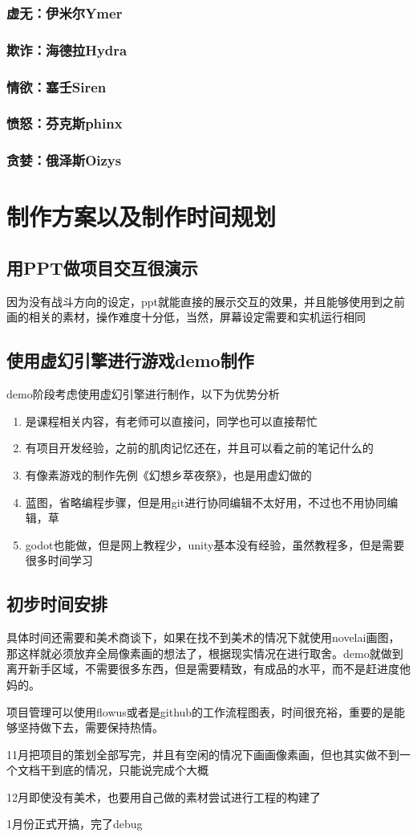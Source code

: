 \documentclass{ctexart}
\begin{document}
			\subsubsection{虚无：伊米尔Ymer}
			\subsubsection{欺诈：海德拉Hydra}
			\subsubsection{情欲：塞壬Siren}
			\subsubsection{愤怒：芬克斯phinx}
			\subsubsection{贪婪：俄泽斯Oizys}
		\section{制作方案以及制作时间规划}
			\subsection{用PPT做项目交互很演示}
			因为没有战斗方向的设定，ppt就能直接的展示交互的效果，并且能够使用到之前画的相关的素材，操作难度十分低，当然，屏幕设定需要和实机运行相同
			\subsection{使用虚幻引擎进行游戏demo制作}
			demo阶段考虑使用虚幻引擎进行制作，以下为优势分析
			\begin{enumerate}
				\item 是课程相关内容，有老师可以直接问，同学也可以直接帮忙
				\item 有项目开发经验，之前的肌肉记忆还在，并且可以看之前的笔记什么的
				\item 有像素游戏的制作先例《幻想乡萃夜祭》，也是用虚幻做的
				\item 蓝图，省略编程步骤，但是用git进行协同编辑不太好用，不过也不用协同编辑，草
				\item godot也能做，但是网上教程少，unity基本没有经验，虽然教程多，但是需要很多时间学习
			\end{enumerate}
			\subsection{初步时间安排}
				具体时间还需要和美术商谈下，如果在找不到美术的情况下就使用novelai画图，那这样就必须放弃全局像素画的想法了，根据现实情况在进行取舍。demo就做到离开新手区域，不需要很多东西，但是需要精致，有成品的水平，而不是赶进度他妈的。
				
				项目管理可以使用flowus或者是github的工作流程图表，时间很充裕，重要的是能够坚持做下去，需要保持热情。
				
				11月把项目的策划全部写完，并且有空闲的情况下画画像素画，但也其实做不到一个文档干到底的情况，只能说完成个大概
				
				12月即使没有美术，也要用自己做的素材尝试进行工程的构建了
				
				1月份正式开搞，完了debug
		
\end{document}
